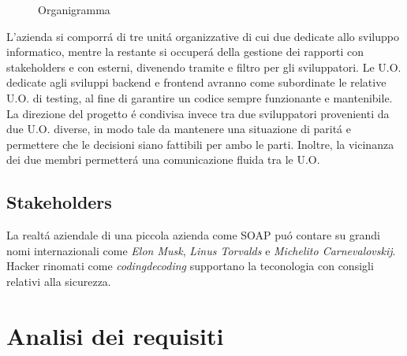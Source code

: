 \documentclass[../../documentazione.tex]{subfiles}
\begin{document}
    \begin{figure}
        \caption{Organigramma}
    \end{figure}

    L'azienda si comporrá di tre unitá organizzative di cui due dedicate allo sviluppo informatico, mentre la restante
    si occuperá della gestione dei rapporti con stakeholders e con esterni, divenendo tramite e filtro per gli sviluppatori.
    Le U.O. dedicate agli sviluppi backend e frontend avranno come subordinate le relative U.O. di testing,
    al fine di garantire un codice sempre funzionante e mantenibile.
    La direzione del progetto é condivisa invece tra due sviluppatori provenienti da due U.O. diverse, in modo tale
    da mantenere una situazione di paritá e permettere che le decisioni siano fattibili per ambo le parti.
    Inoltre, la vicinanza dei due membri permetterá una comunicazione fluida tra le U.O.

    \subsection{Stakeholders}\label{sec:steackholders}
    La realtá aziendale di una piccola azienda come SOAP puó contare su grandi nomi internazionali come
    \textit{Elon Musk}, \textit{Linus Torvalds} e \textit{Michelito Carnevalovskij}.
    Hacker rinomati come \textit{codingdecoding} supportano la teconologia con consigli relativi alla sicurezza.

    \section{Analisi dei requisiti}\label{sec:analisi-dei-requisiti}
\end{document}
